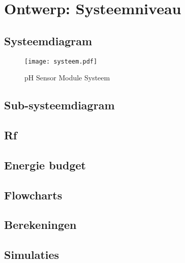 \section{Ontwerp: Systeemniveau}
\subsection{Systeemdiagram}
\begin{figure}[ht]
    \centering
    \texttt{[image: systeem.pdf]}
    \caption[short]{pH Sensor Module Systeem}
\end{figure}
\subsection{Sub-systeemdiagram }%


\subsection{Rf}

\subsection{Energie budget}

\subsection{Flowcharts}
\subsection{Berekeningen}
\subsection{Simulaties}




%
